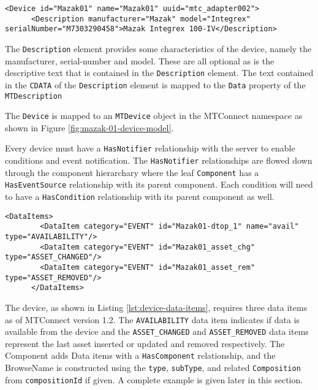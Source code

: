 \begin{lstlisting}[firstnumber=last,%
    caption={\texttt{Device} Element Mapping},label={lst:device-model-device}]
    <Device id="Mazak01" name="Mazak01" uuid="mtc_adapter002">
      <Description manufacturer="Mazak" model="Integrex" serialNumber="M7303290458">Mazak Integrex 100-IV</Description>
\end{lstlisting}

The \texttt{Description} element provides some characteristics of the device, namely the manufacturer, serial-number and model. These are all optional as is the descriptive text that is contained in the \texttt{Description} element. The text contained in the \texttt{CDATA} of the \texttt{Description} element is mapped to the \texttt{Data} property of the \texttt{MTDescription}

The \texttt{Device} is mapped to an \texttt{MTDevice} object in the MTConnect namespace as shown in Figure \ref{fig:mazak-01-device-model}.



Every device must have a \texttt{HasNotifier} relationship with the server to enable conditions and event notification. The \texttt{HasNotifier} relationships are flowed down through the component hierarchary where the leaf \texttt{Component} has a \texttt{HasEventSource} relationship with its parent component. Each condition will need to have a \texttt{HasCondition} relationship with its parent component as well. 

\begin{lstlisting}[firstnumber=last,%
    caption={Device Data Items},label={lst:device-data-items}]
      <DataItems>
        <DataItem category="EVENT" id="Mazak01-dtop_1" name="avail" type="AVAILABILITY"/>
        <DataItem category="EVENT" id="Mazak01_asset_chg" type="ASSET_CHANGED"/>
        <DataItem category="EVENT" id="Mazak01_asset_rem" type="ASSET_REMOVED"/>
      </DataItems>
\end{lstlisting}

The device, as shown in Listing \ref{lst:device-data-items}, requires three data items as of MTConnect version 1.2. The \texttt{AVAILABILITY} data item indicates if data is available from the device and the \texttt{ASSET_CHANGED} and \texttt{ASSET_REMOVED} data items represent the last asset inserted or updated and removed respectively. The Component adds Data items with a \texttt{Has\-Component} relationship, and the BrowseName is constructed using the \texttt{type}, \texttt{sub\-Type}, and related \texttt{Composition} from \texttt{compositionId} if given. A complete example is given later in this section.


